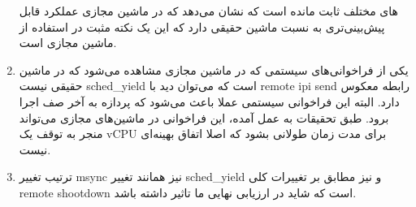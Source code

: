 \begin{enumerate}
    های مختلف ثابت مانده است که نشان می‌دهد که در ماشین مجازی عملکرد قابل پیش‌بینی‌تری به نسبت ماشین حقیقی دارد که این یک نکته مثبت در استفاده از ماشین مجازی است.
    \item 
    یکی از فراخوانی‌های سیستمی که در ماشین مجازی مشاهده می‌شود که در ماشین حقیقی نیست 
    sched\_yield
    است که می‌توان دید با remote ipi send 
    رابطه معکوس دارد. البته این فراخوانی سیستمی عملا باعث می‌شود که پردازه به آخر صف اجرا برود.
    طبق تحقیقات به عمل آمده،‌ این فراخوانی در ماشین‌های مجازی می‌تواند منجر به توقف یک vCPU برای مدت زمان طولانی بشود که اصلا اتفاق بهینه‌ای نیست.
    \item ترتیب تغییر msync نیز همانند تغییر sched\_yield و نیز مطابق بر تغییرات کلی remote shootdown است که شاید در ارزیابی نهایی ما تاثیر داشته باشد.
 \end{enumerate}